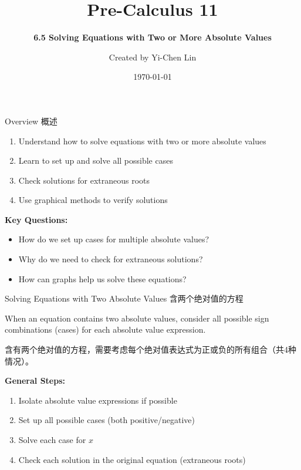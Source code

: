 \documentclass[aspectratio=169]{beamer}
\title{Pre-Calculus 11}
\subtitle{\textbf{6.5 Solving Equations with Two or More Absolute Values}}
\author{Created by Yi-Chen Lin}
\date{\today}
\begin{document}
\begin{frame}
    \titlepage
    \vfill
\end{frame}

\begin{frame}{Overview 概述}
    \begin{tcolorbox}[colback=lightgray,colframe=primary,title=What We Will Learn 学习目标]
        \footnotesize
        \begin{enumerate}
            \item Understand how to solve equations with two or more absolute values
            \item Learn to set up and solve all possible cases
            \item Check solutions for extraneous roots
            \item Use graphical methods to verify solutions
        \end{enumerate}
    \end{tcolorbox}
    \vspace{1em}
    \textbf{Key Questions:}
    \begin{itemize}
        \item How do we set up cases for multiple absolute values?
        \item Why do we need to check for extraneous solutions?
        \item How can graphs help us solve these equations?
    \end{itemize}
\end{frame}

\begin{frame}{Solving Equations with Two Absolute Values 含两个绝对值的方程}
    \begin{tcolorbox}[colback=lightgray,colframe=primary,title=Key Idea 关键思路]
        \footnotesize
        When an equation contains two absolute values, consider all possible sign combinations (cases) for each absolute value expression.
        \par
        含有两个绝对值的方程，需要考虑每个绝对值表达式为正或负的所有组合（共4种情况）。
    \end{tcolorbox}
    \vspace{1em}
    \textbf{General Steps:}
    \begin{enumerate}
        \item Isolate absolute value expressions if possible
        \item Set up all possible cases (both positive/negative)
        \item Solve each case for $x$
        \item Check each solution in the original equation (extraneous roots)
    \end{enumerate}
\end{frame}
\end{document}
